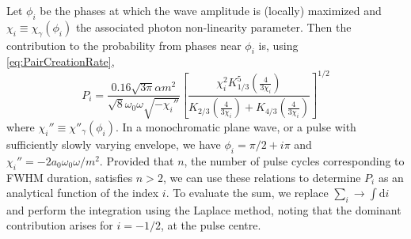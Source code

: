 \documentclass[reprint,superscriptaddress,amsmath,amssymb,aps,pra]{revtex4-1}
\newcommand{\rmd}{\mathrm{d}}
\newcommand{\aux}{\mathcal{R}}
\begin{document}
Let $\phi_i$ be the phases at which the wave amplitude is (locally) maximized
and $\chi_i \equiv \chi_\gamma(\phi_i)$ the associated photon non-linearity parameter.
Then the contribution to the probability from phases near $\phi_i$ is, using
\cref{eq:PairCreationRate},
	\begin{equation}
	P_i  =
		\frac{0.16 \sqrt{3\pi} \alpha m^2}{\sqrt{8} \omega_0 \omega \sqrt{-\chi_i''}}
		\left[
			\frac{\chi_i^2 K_{1/3}^5\!\left(\frac{4}{3\chi_i}\right)}
			{K_{2/3}\!\left(\frac{4}{3\chi_i}\right) + K_{4/3}\!\left(\frac{4}{3\chi_i}\right)}
		\right]^{1/2}
	\end{equation}
where $\chi_i'' \equiv \chi''_\gamma(\phi_i)$.
In a monochromatic plane wave, or a pulse with sufficiently slowly varying
envelope, we have $\phi_i = \pi/2 + i \pi$ and
$\chi_i'' = -2 a_0 \omega_0 \omega / m^2$. Provided that $n$, the number of
pulse cycles corresponding to FWHM duration, satisfies $n>2$, we can
use these relations to determine $P_i$ as an analytical function of the index $i$.
To evaluate the sum, we replace $\sum_i \rightarrow \int \rmd i$ and perform
the integration using the Laplace method, noting that the dominant contribution
arises for $i = -1/2$, at the pulse centre.

\end{document}
